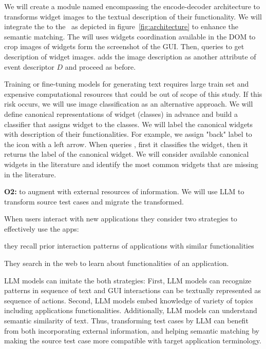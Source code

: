 \bigskip
We will create a module named \imagelabeler encompassing the encode-decoder architecture to transforms widget images to the textual description of their functionality.
We will integrate the \imagelabeler to the \testreuse~\architecture  as depicted in figure~\ref{fig:architecture} to enhance the semantic matching.
The \ede  will uses widgets coordination available in the DOM to crop images of widgets form the screenshot of the GUI.
Then, \ede queries \imagelabeler to get description of  widget images.
\ede adds the image description as another attribute of event descriptor $D$ and \matcher proceed as before.


\bigskip
Training or fine-tuning models for generating text requires large train set and expensive computational resources that could be out of scope of this study. 
If this risk occurs, we will use image classification as an alternative approach.
We will define canonical representations of widget  (classes) in advance and build a classifier that assigns widget to the classes.
We will label the canonical widgets with description of their functionalities.
For example, we assign "back" label to the icon with a left arrow.
 When \ede queries \imagelabeler, first it classifies the widget, then it returns the label of the canonical widget.
We will consider available canonical widgets in the literature and identify the most common widgets that are missing in the literature. 




\bigskip
\noindent
\textbf{O2:} to augment \testreuse with external resources of information.
We will use LLM to transform source test cases and migrate the transformed.

\bigskip
When users interact with new applications they consider two strategies to effectively use the apps:
\begin{inparaenum}[a)]
\item they recall prior  interaction patterns of  applications with similar functionalities
\item They search in the web to learn about functionalities of an application.
\end{inparaenum}
LLM models can imitate the both strategies:
First, LLM models can recognize patterns in sequence of text and  GUI interactions can be textually represented as sequence of actions. 
Second, LLM models embed knowledge of variety of topics including applications functionalities.
Additionally, LLM models can understand semantic similarity of text. 
Thus, transforming test cases by LLM can benefit from both incorporating external information, and helping semantic matching by making the source test case more compatible with target application terminology.



